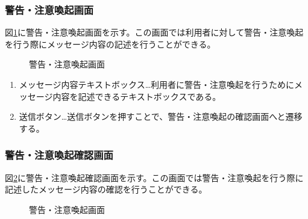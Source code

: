 \documentclass[a4j]{jarticle}
\begin{document}
\subsubsection{警告・注意喚起画面}
図\ref{fig:warning}に警告・注意喚起画面を示す。この画面では利用者に対して警告・注意喚起を行う際にメッセージ内容の記述を行うことができる。

\begin{figure}[H]
\centering
{}
\caption{警告・注意喚起画面}
\label{fig:warning}
\end{figure}

\begin{enumerate}
  \renewcommand{\labelenumi}{\textcircled{\scriptsize \theenumi}}

\item メッセージ内容テキストボックス…利用者に警告・注意喚起を行うためにメッセージ内容を記述できるテキストボックスである。
\item 送信ボタン…送信ボタンを押すことで、警告・注意喚起の確認画面へと遷移する。
\end{enumerate}

\subsubsection{警告・注意喚起確認画面}
図\ref{fig:warning_confirm}に警告・注意喚起確認画面を示す。この画面では警告・注意喚起を行う際に記述したメッセージ内容の確認を行うことができる。
\begin{figure}[H]
\centering
{}
\caption{警告・注意喚起画面}
\label{fig:warning_confirm}
\end{figure}
\end{document}

